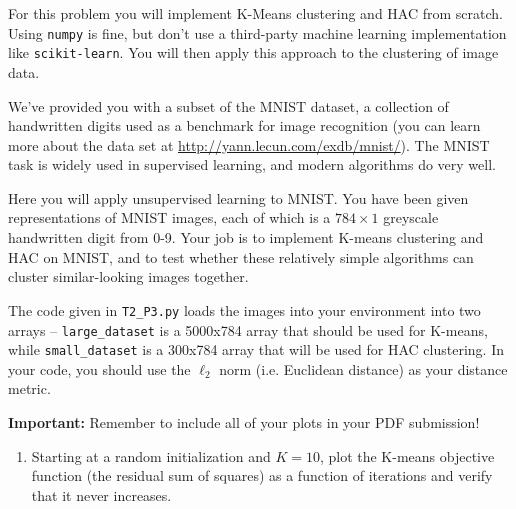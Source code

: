 \documentclass[submit]{harvardml}
\begin{document}



\begin{problem}


For this problem you will implement K-Means clustering and HAC from
scratch. Using \texttt{numpy} is fine, but don't use a third-party
machine learning implementation like \texttt{scikit-learn}. You will
then apply this approach to the clustering of image data.

We've provided you with a subset of the MNIST dataset, a collection of
handwritten digits used as a benchmark for image recognition (you can
learn more about the data set at
\url{http://yann.lecun.com/exdb/mnist/}). The MNIST task is widely
used in supervised learning, and modern algorithms do very well.

Here you will apply unsupervised learning to MNIST. You have been given
representations of MNIST images, each of which is a $784\times1$
greyscale handwritten digit from 0-9. Your job is to implement K-means
clustering and HAC on MNIST, and to test whether these relatively
simple algorithms can cluster similar-looking images together.

The code given in \texttt{T2\_P3.py} loads the images into your environment into two arrays -- \texttt{large\_dataset} is a 5000x784 array that should be used for K-means, while \texttt{small\_dataset} is a 300x784 array that will be used for HAC clustering. In your code, you should use the $\ell_2$ norm (i.e. Euclidean distance) as your distance metric.

\textbf{Important:} Remember to include all of your plots in your PDF submission!

\begin{enumerate}

\item Starting at a random initialization and $K = 10$, plot
  the K-means objective function (the residual sum of squares) as a function of iterations and verify
  that it never increases.


\end{enumerate}
\end{problem}
\end{document}
